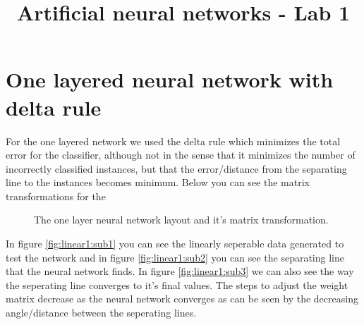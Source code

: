 \documentclass[a4paper,11pt]{article}
\title{\textbf{\huge{Artificial neural networks - Lab 1}}}
\begin{document}
\maketitle

\section{One layered neural network with delta rule}

For the one layered network we used the delta rule which minimizes the total error for the classifier, although not in the sense that it minimizes the number of incorrectly classified instances, but that the error/distance from the separating line to the instances becomes minimum. Below you can see the matrix transformations for the 

\vspace{5cm}
\begin{figure}[h!]
\caption{The one layer neural network layout and it's matrix transformation.}
\end{figure}

In figure \ref{fig:linear1:sub1} you can see the linearly seperable data generated to test the network and in figure \ref{fig:linear1:sub2} you can see the separating line that the neural network finds. In figure \ref{fig:linear1:sub3} we can also see the way the seperating line converges to it's final values. The steps to adjust the weight matrix decrease as the neural network converges as can be seen by the decreasing angle/distance between the seperating lines.
\end{document}
